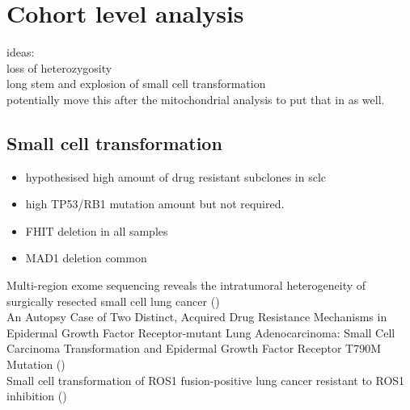 

\section{Cohort level analysis}
\label{cascade-sec:cohortLevel}

ideas:\\
loss of heterozygosity \\
long stem and explosion of small cell transformation\\
potentially move this after the mitochondrial analysis to put that in as well.


\subsection{Small cell transformation}

\begin{itemize}
\item hypothesised high amount of drug resistant subclones in sclc
\item high TP53/RB1 mutation amount but not required.
\item FHIT deletion in all samples
\item MAD1 deletion common
\end{itemize}
 \cite{Meerbeeck2011}


Multi-region exome sequencing reveals the intratumoral heterogeneity of surgically resected small cell lung cancer (\textcite{Zhou2021}) \\
 An Autopsy Case of Two Distinct, Acquired Drug Resistance Mechanisms in Epidermal Growth Factor Receptor-mutant Lung Adenocarcinoma: Small Cell Carcinoma Transformation and Epidermal Growth Factor Receptor T790M Mutation (\textcite{Furugen2015}) \\
Small cell transformation of ROS1 fusion-positive lung cancer resistant to ROS1 inhibition (\textcite{Lin2020})